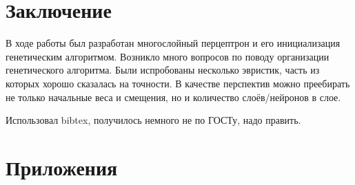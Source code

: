 \documentclass[a4paper,12pt]{article}
\begin{document}
\newpage\section*{Заключение}
В ходе работы был разработан многослойный перцептрон и его инициализация генетическим алгоритмом. Возникло много вопросов по поводу организации генетического алгоритма. Были испробованы несколько эвристик, часть из которых хорошо сказалась на точности. В качестве перспектив можно преебирать не только начальные веса и смещения, но и количество слоёв/нейронов в слое.


\newpage
\renewcommand\refname{Список использованных источников}
Использовал bibtex, получилось немного не по ГОСТу, надо править.
\nocite{*}


\newpage\section*{Приложения}
\end{document}
